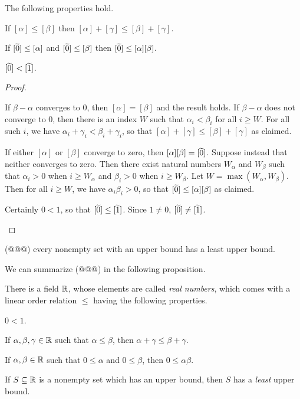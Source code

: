 \begin{prop}
The following properties hold.
\begin{proplist}
\item If \([\alpha] \leq [\beta]\) then \([\alpha] + [\gamma] \leq [\beta] + [\gamma]\).
\item If \([\widetilde{0}] \leq [\alpha]\) and \([\widetilde{0}] \leq [\beta]\) then \([\widetilde{0}] \leq [\alpha][\beta]\).
\item \([\widetilde{0}] < [\widetilde{1}]\).
\end{proplist}
\end{prop}

\begin{proof} \mbox{}
\begin{proplist}
\item If \(\beta - \alpha\) converges to 0, then \([\alpha] = [\beta]\) and the result holds.
If \(\beta - \alpha\) does not converge to 0, then there is an index \(W\) such that \(\alpha_i < \beta_i\) for all \(i \geq W\).
For all such \(i\), we have \(\alpha_i + \gamma_i < \beta_i + \gamma_i\), so that \([\alpha] + [\gamma] \leq [\beta] + [\gamma]\) as claimed.
\item If either \([\alpha]\) or \([\beta]\) converge to zero, then \([\alpha][\beta] = [\widetilde{0}]\).
Suppose instead that neither converges to zero.
Then there exist natural numbers \(W_\alpha\) and \(W_\beta\) such that \(\alpha_i > 0\) when \(i \geq W_\alpha\) and \(\beta_i > 0\) when \(i \geq W_\beta\).
Let \(W = \max(W_\alpha, W_\beta)\).
Then for all \(i \geq W\), we have \(\alpha_i \beta_i > 0\), so that \([\widetilde{0}] \leq [\alpha][\beta]\) as claimed.
\item Certainly \(0 < 1\), so that \([\widetilde{0}] \leq [\widetilde{1}]\).
Since \(1 \neq 0\), \([\widetilde{0}] \neq [\widetilde{1}]\).
\end{proplist}
\end{proof}

\begin{prop}
(@@@) every nonempty set with an upper bound has a least upper bound.
\end{prop}

We can summarize (@@@) in the following proposition.

\begin{prop} \label{prop:rr-axioms}
There is a field \(\mathbb{R}\), whose elements are called \emph{real numbers}, which comes with a linear order relation \(\leq\) having the following properties.
\begin{proplist}
\item \(0 < 1\).
\item If \(\alpha, \beta, \gamma \in \mathbb{R}\) such that \(\alpha \leq \beta\), then \(\alpha + \gamma \leq \beta + \gamma\).
\item If \(\alpha, \beta \in \mathbb{R}\) such that \(0 \leq \alpha\) and \(0 \leq \beta\), then \(0 \leq \alpha\beta\).
\item If \(S \subseteq \mathbb{R}\) is a nonempty set which has an upper bound, then \(S\) has a \emph{least} upper bound.
\end{proplist}
\end{prop}

